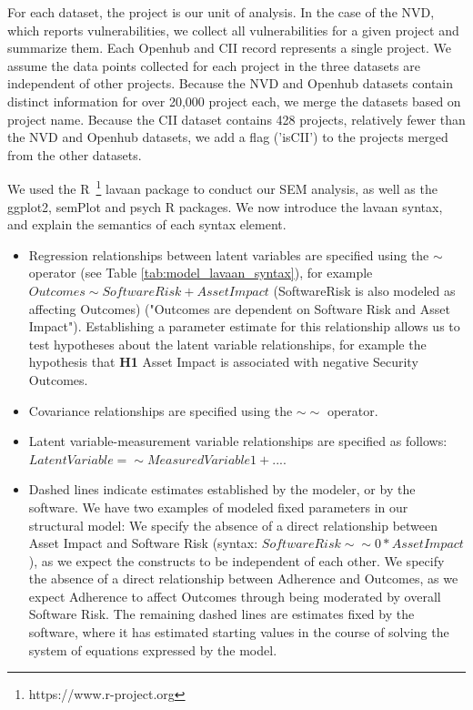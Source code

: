 For each dataset, the project is our unit of analysis. In the case of the NVD, which reports vulnerabilities, we collect all vulnerabilities for a given project and summarize them. Each Openhub and CII record represents a single project. We assume the data points collected for each project in the three datasets are independent of other projects. Because the NVD and Openhub datasets contain distinct information for over 20,000 project each, we merge the datasets based on project name. Because the CII dataset contains 428 projects, relatively fewer than the NVD and Openhub datasets, we add a flag ('isCII') to the projects merged from the other datasets.

We used the R~\footnote{https://www.r-project.org} lavaan package to conduct our SEM analysis, as well as the ggplot2, semPlot and psych R packages. We now introduce the lavaan syntax, and explain the semantics of each syntax element.

\begin{itemize}
\item Regression relationships between latent variables are specified using the $\sim$  operator (see Table \ref{tab:model_lavaan_syntax}), for example $Outcomes \sim SoftwareRisk + AssetImpact$ (SoftwareRisk is also modeled as affecting Outcomes) ("Outcomes are dependent on Software Risk and Asset Impact"). Establishing a parameter estimate for this relationship allows us to test hypotheses about the latent variable relationships, for example the hypothesis that \textbf{H1} Asset Impact is associated with negative Security Outcomes.
 \item Covariance relationships are specified using the $\sim\sim$ operator.
\item Latent variable-measurement variable relationships are specified as follows: $LatentVariable =\sim MeasuredVariable1 + ...$. 
\item Dashed lines indicate estimates established by the modeler, or by the software. We have two examples of modeled fixed parameters in our structural model: We specify the absence of a direct relationship between Asset Impact and Software Risk (syntax: $SoftwareRisk \sim\sim 0*AssetImpact$), as we expect the constructs to be independent of each other. We specify the absence of a direct relationship between Adherence and Outcomes, as we expect Adherence to affect Outcomes through being moderated by overall Software Risk. The remaining dashed lines are estimates fixed by the software, where it has estimated starting values in the course of solving the system of equations expressed by the model.
\end{itemize}

